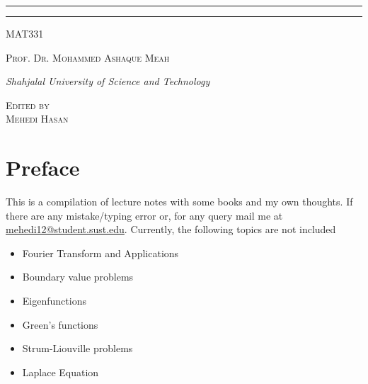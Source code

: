 \documentclass[12pt]{book}
\newcommand{\course}{MAT331}
\newcommand{\prof}{Prof. Dr. Mohammed Ashaque Meah}
\begin{document}
\begin{titlepage}
\rule{345pt}{0.4pt}\vspace*{-\baselineskip}\vspace{3.2pt}
\rule{345pt}{1.6pt}

\vspace{2\baselineskip}

{\scshape \Large{\course}} 

\vspace*{5\baselineskip}



\vspace{0.5\baselineskip} 

{\scshape   \Large \prof\\ }

\vspace{0.75\baselineskip} 

{\textit{\large Shahjalal University of Science and Technology}} 

\vfill 

\vspace{0.3\baselineskip} 


{\scshape \large Edited by\\  Mehedi Hasan} 
\vspace*{40pt}
\end{titlepage}
\newpage
\section*{Preface}
This is a compilation of lecture notes with some books and my own thoughts. If there are any mistake/typing error or, for any query mail me at \href{mailto:mehedi12@student.sust.edu}{mehedi12@student.sust.edu}. Currently, the following topics are not included
\begin{itemize}
    \item Fourier Transform and Applications
    \item Boundary value problems
    \item Eigenfunctions
    \item Green's functions
    \item Strum-Liouville problems
    \item Laplace Equation
\end{itemize}

\newpage
\tableofcontents
\newpage
{}
\end{document}
